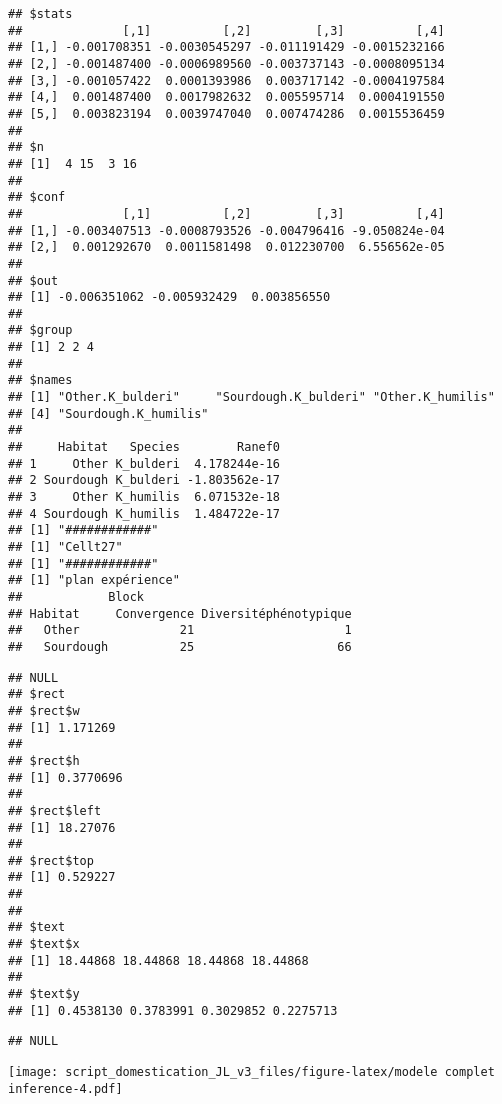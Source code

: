 \documentclass[
]{article}
\begin{document}
\begin{verbatim}
## $stats
##              [,1]          [,2]         [,3]          [,4]
## [1,] -0.001708351 -0.0030545297 -0.011191429 -0.0015232166
## [2,] -0.001487400 -0.0006989560 -0.003737143 -0.0008095134
## [3,] -0.001057422  0.0001393986  0.003717142 -0.0004197584
## [4,]  0.001487400  0.0017982632  0.005595714  0.0004191550
## [5,]  0.003823194  0.0039747040  0.007474286  0.0015536459
## 
## $n
## [1]  4 15  3 16
## 
## $conf
##              [,1]          [,2]         [,3]          [,4]
## [1,] -0.003407513 -0.0008793526 -0.004796416 -9.050824e-04
## [2,]  0.001292670  0.0011581498  0.012230700  6.556562e-05
## 
## $out
## [1] -0.006351062 -0.005932429  0.003856550
## 
## $group
## [1] 2 2 4
## 
## $names
## [1] "Other.K_bulderi"     "Sourdough.K_bulderi" "Other.K_humilis"    
## [4] "Sourdough.K_humilis"
## 
##     Habitat   Species        Ranef0
## 1     Other K_bulderi  4.178244e-16
## 2 Sourdough K_bulderi -1.803562e-17
## 3     Other K_humilis  6.071532e-18
## 4 Sourdough K_humilis  1.484722e-17
## [1] "############"
## [1] "Cellt27"
## [1] "############"
## [1] "plan expérience"
##            Block
## Habitat     Convergence Diversitéphénotypique
##   Other              21                     1
##   Sourdough          25                    66
\end{verbatim}

\begin{verbatim}
## NULL
## $rect
## $rect$w
## [1] 1.171269
## 
## $rect$h
## [1] 0.3770696
## 
## $rect$left
## [1] 18.27076
## 
## $rect$top
## [1] 0.529227
## 
## 
## $text
## $text$x
## [1] 18.44868 18.44868 18.44868 18.44868
## 
## $text$y
## [1] 0.4538130 0.3783991 0.3029852 0.2275713
\end{verbatim}

\begin{verbatim}
## NULL
\end{verbatim}

\texttt{[image: script\_domestication\_JL\_v3\_files/figure-latex/modele complet inference-4.pdf]}
\end{document}
